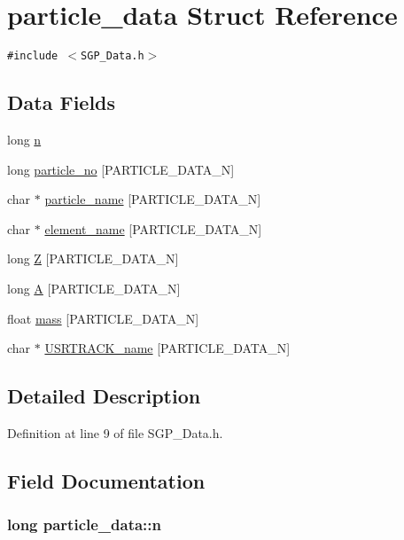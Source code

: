 \hypertarget{structparticle__data}{
\section{particle\_\-data Struct Reference}
\label{d6/dac/structparticle__data}
}
{\tt \#include $<$SGP\_\-Data.h$>$}

\subsection*{Data Fields}
\begin{CompactItemize}
\item 
long \hyperlink{structparticle__data_3c32b0430334c6be7930f688172ebaeb}{n}
\item 
long \hyperlink{structparticle__data_eed610bc58086737e01a79647b19d9d9}{particle\_\-no} \mbox{[}PARTICLE\_\-DATA\_\-N\mbox{]}
\item 
char $\ast$ \hyperlink{structparticle__data_0ebe80869d03628d77c855fbc574dcd4}{particle\_\-name} \mbox{[}PARTICLE\_\-DATA\_\-N\mbox{]}
\item 
char $\ast$ \hyperlink{structparticle__data_7567c2bf554d06d27fc80685da9f4da1}{element\_\-name} \mbox{[}PARTICLE\_\-DATA\_\-N\mbox{]}
\item 
long \hyperlink{structparticle__data_6388499656a78568105f86cfdfffddaa}{Z} \mbox{[}PARTICLE\_\-DATA\_\-N\mbox{]}
\item 
long \hyperlink{structparticle__data_4531a4160109db46a68c19af96f61ec1}{A} \mbox{[}PARTICLE\_\-DATA\_\-N\mbox{]}
\item 
float \hyperlink{structparticle__data_e832458e2519a30d9ed3c7fc90eea252}{mass} \mbox{[}PARTICLE\_\-DATA\_\-N\mbox{]}
\item 
char $\ast$ \hyperlink{structparticle__data_e0e12608aa6af83103a9fdd854eda3d4}{USRTRACK\_\-name} \mbox{[}PARTICLE\_\-DATA\_\-N\mbox{]}
\end{CompactItemize}


\subsection{Detailed Description}


Definition at line 9 of file SGP\_\-Data.h.

\subsection{Field Documentation}
\hypertarget{structparticle__data_3c32b0430334c6be7930f688172ebaeb}{
\subsubsection[n]{\setlength{\rightskip}{0pt plus 5cm}long {\bf particle\_\-data::n}}}
\label{d6/dac/structparticle__data_3c32b0430334c6be7930f688172ebaeb}




